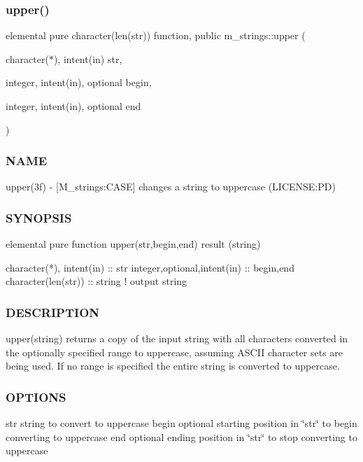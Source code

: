 \subsubsection{\texorpdfstring{upper()}{upper()}}
{\footnotesize\ttfamily elemental pure character(len(str)) function, public m\+\_\+strings\+::upper (\begin{DoxyParamCaption}\item[{character($\ast$), intent(in)}]{str,  }\item[{integer, intent(in), optional}]{begin,  }\item[{integer, intent(in), optional}]{end }\end{DoxyParamCaption})}



\subsubsection*{N\+A\+ME}

upper(3f) -\/ \mbox{[}M\+\_\+strings\+:C\+A\+SE\mbox{]} changes a string to uppercase (L\+I\+C\+E\+N\+SE\+:PD) 

\subsubsection*{S\+Y\+N\+O\+P\+S\+IS}

\begin{DoxyVerb}elemental pure function upper(str,begin,end) result (string)

 character(*), intent(in)    :: str
 integer,optional,intent(in) :: begin,end
 character(len(str))         :: string  ! output string
\end{DoxyVerb}
 \subsubsection*{D\+E\+S\+C\+R\+I\+P\+T\+I\+ON}

upper(string) returns a copy of the input string with all characters converted in the optionally specified range to uppercase, assuming A\+S\+C\+II character sets are being used. If no range is specified the entire string is converted to uppercase.

\subsubsection*{O\+P\+T\+I\+O\+NS}

str string to convert to uppercase begin optional starting position in \char`\"{}str\char`\"{} to begin converting to uppercase end optional ending position in \char`\"{}str\char`\"{} to stop converting to uppercase


